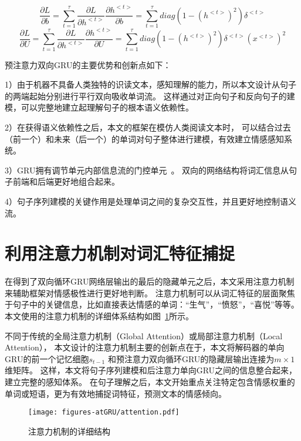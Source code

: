 \begin{equation}
    \frac{\partial L}{\partial b}=\sum_{t=1}^{\tau }\frac{\partial L}{\partial h^{<t>}}\frac{\partial h^{<t>}}{\partial b}=\sum_{t=1}^{\tau }diag\left ( 1-\left ( h^{<t>} \right )^{2} \right )\delta^{<t>}
\end{equation}
\begin{equation}
    \frac{\partial L}{\partial U}=\sum_{t=1}^{\tau }\frac{\partial L}{\partial h^{<t>}}\frac{\partial h^{<t>}}{\partial U}=\sum_{t=1}^{\tau }diag\left ( 1-\left ( h^{<t>} \right )^{2} \right )\delta^{<t>}\left (x^{<t>} \right )^{2}
\end{equation}

预注意力双向GRU的主要优势和创新点如下：

1）由于机器不具备人类独特的识读文本，感知理解的能力，所以本文设计从句子的两端起始分别进行平行双向吸收单词流。
这样通过对正向句子和反向句子的建模，可以完整地建立起理解句子的根本语义依赖性。

2）在获得语义依赖性之后，本文的框架在模仿人类阅读文本时，
可以结合过去（前一个）和未来（后一个）的单词对句子整体进行建模，有效建立情感感知系统。

3）GRU拥有调节单元内部信息流的门控单元~。
双向的网络结构将词汇信息从句子前端和后端更好地组合起来。

4）句子序列建模的关键作用是处理单词之间的复杂交互性，并且更好地控制语义流。

\section{利用注意力机制对词汇特征捕捉}
在得到了双向循环GRU网络层输出的最后的隐藏单元之后，本文采用注意力机制来辅助框架对情感极性进行更好地判断。
注意力机制可以从词汇特征的层面聚焦于句子中的关键信息，比如直接表达情感的单词：“生气”，“愤怒”，“喜悦”等等。
本文使用的注意力机制的详细体系结构如图~\ref{fig:fig2}所示。

不同于传统的全局注意力机制（Global Attention）或局部注意力机制（Local Attention），
本文设计的注意力机制主要的创新点在于，本文将解码器的单向GRU的前一个记忆细胞${s_{t-1}}$
和预注意力双向循环GRU的隐藏层输出连接为${m\times1}$维矩阵。
这样，本文将句子序列建模和后注意力单向GRU之间的信息整合起来，建立完整的感知体系。
在句子理解之后，本文开始重点关注特定包含情感权重的单词或短语，更为有效地捕捉词特征，预测文本的情感倾向。

\begin{figure}[h!]
    \centering
    \texttt{[image: figures-atGRU/attention.pdf]}
    \caption{注意力机制的详细结构}
    \label{fig:fig2}
\end{figure}

